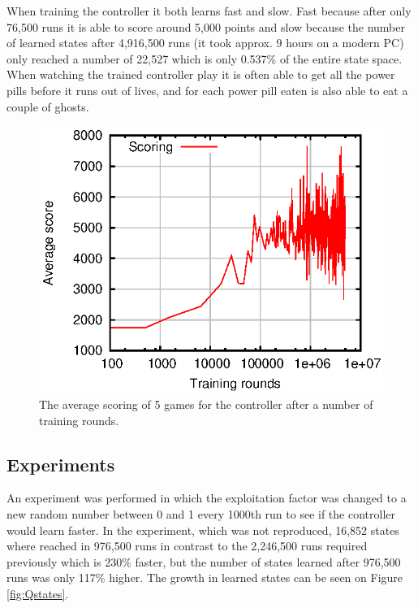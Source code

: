 \documentclass[conference]{IEEEtran}
\begin{document}
When training the controller it both learns fast and slow. Fast because after only 76,500 runs it is able to score around 5,000 points and slow because the number of learned states after 4,916,500 runs (it took approx. 9 hours on a modern PC) only reached a number of 22,527 which is only 0.537\% of the entire state space. When watching the trained controller play it is often able to get all the power pills before it runs out of lives, and for each power pill eaten is also able to eat a couple of ghosts.

\begin{figure}[!htb]
\centering
\includegraphics[scale=.7]{qstdscore}
\caption{The average scoring of 5 games for the controller after a number of training rounds.}
\label{fig:Qscore}
\end{figure}

\subsection{Experiments}
An experiment was performed in which the exploitation factor was changed to a new random number between 0 and 1 every 1000th run to see if the controller would learn faster. In the experiment, which was not reproduced, 16,852 states where reached in 976,500 runs in contrast to the 2,246,500 runs required previously which is 230\% faster, but the number of states learned after 976,500 runs was only 117\% higher. The growth in learned states can be seen on Figure \ref{fig:Qstates}.
\end{document}
